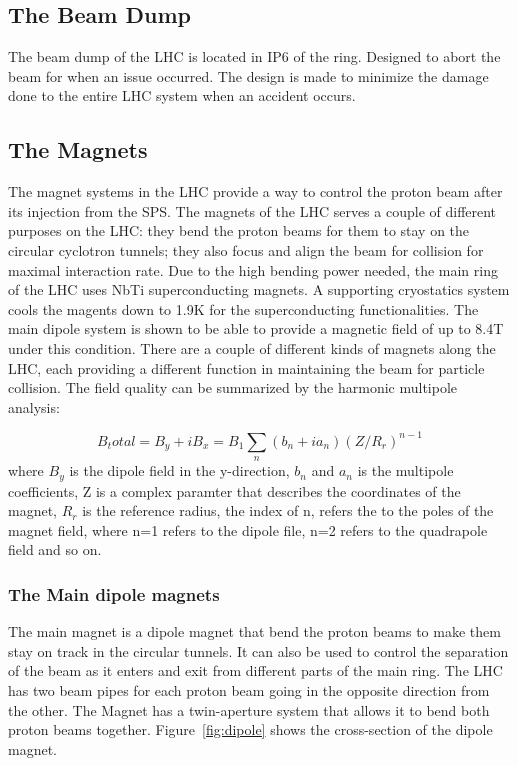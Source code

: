 \subsection*{The Beam Dump}
The beam dump of the LHC is located in IP6 of the ring. Designed to abort the beam for when an issue occurred. The design is made to minimize the damage done to the entire LHC system when an accident occurs. 

\subsection*{The Magnets}
The magnet systems in the LHC provide a way to control the proton beam after its injection from the SPS. The magnets of the LHC serves a couple of different purposes on the LHC: they bend the proton beams for them to stay on the circular cyclotron tunnels; they also focus and align the beam for collision for maximal interaction rate. Due to the high bending power needed, the main ring of the LHC uses NbTi superconducting magnets.  A supporting cryostatics system cools the magents down to 1.9K
for the superconducting functionalities. The main dipole system is shown to be able to provide a magnetic field of up to 8.4T under this condition. There are a couple of different kinds of magnets along the
LHC, each providing a different function in maintaining the beam for particle collision. The field quality can be summarized by the harmonic multipole analysis: 

\[ B_total = B_y+ iB_x  = B_1\sum_n(b_{n} + i a_{n})(Z/R_{r})^{n-1}\]
where $B_y$ is the dipole field in the y-direction, $b_{n}$ and $a_n$ is the multipole coefficients, Z is a complex paramter that describes the coordinates of the magnet, $R_{r}$ is the reference radius, the index of n, refers the to the poles of the magnet field, where n=1 refers to the dipole file, n=2 refers to the quadrapole field and so on. 

\subsubsection*{The Main dipole magnets}
The main magnet is a dipole magnet that bend the proton beams to make them stay on track in the circular tunnels. It can also be used to control the separation of the beam as it enters and exit from different parts of the main ring. 
The LHC has two beam pipes for each proton beam going in the opposite direction from the other. The Magnet has a twin-aperture system that allows it to bend both proton beams together. Figure~\ref{fig:dipole} shows the cross-section of the dipole magnet. 

